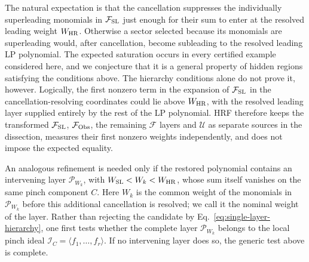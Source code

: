 \documentclass[a4paper,11pt]{article}
\newcommand{\FSL}{\mathcal F_{\rm SL}}
\newcommand{\FObs}{\mathcal F_{\rm Obs}}
\newcommand{\WSL}{W_{\rm SL}}
\newcommand{\WHR}{W_{\rm HR}}
\newcommand{\ideal}{\mathcal I}
\begin{document}
The natural expectation is that the cancellation suppresses the individually
superleading monomials in \(\FSL\) just enough for their sum to enter at the
resolved leading weight \(\WHR\).  Otherwise a sector selected because its
monomials are superleading would, after cancellation, become subleading to
the resolved leading LP polynomial.  The expected saturation occurs in every
certified example considered here, and we conjecture that it is a general
property of hidden regions satisfying the conditions above.  The
hierarchy conditions alone do not prove it, however.  Logically, the first
nonzero term in the expansion of \(\FSL\) in the cancellation-resolving
coordinates could lie above \(\WHR\), with the resolved
leading layer supplied entirely by the rest of the LP polynomial.  HRF
therefore keeps the transformed \(\FSL\), \(\FObs\), the remaining
\(\mathcal F\) layers and \(\mathcal U\) as separate sources in the
dissection, measures their first nonzero weights independently, and does not
impose the expected equality.

An analogous refinement is needed only if the restored polynomial contains
an intervening layer \(\mathcal P_{W_k}\), with
\(\WSL<W_k<\WHR\), whose sum itself vanishes on the same pinch component
\(C\).  Here \(W_k\) is the common weight of the monomials in
\(\mathcal P_{W_k}\) before this additional cancellation is resolved; we call
it the nominal weight of the layer.  Rather than rejecting the candidate by
Eq.~\eqref{eq:single-layer-hierarchy}, one first tests whether the complete
layer \(\mathcal P_{W_k}\) belongs to the local pinch ideal
\(\ideal_C=\langle f_1,\ldots,f_r\rangle\).  If no intervening layer does so,
the generic test above is complete.
\end{document}
